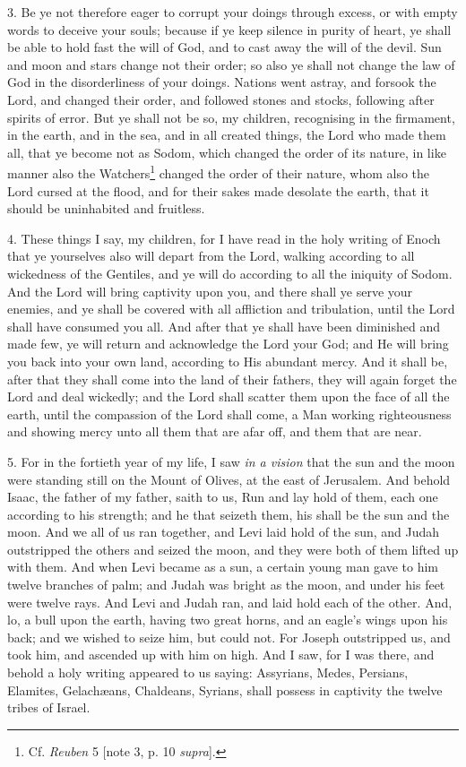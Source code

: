 3. Be ye not therefore eager to corrupt your doings through excess, or with empty words to deceive your souls; because if ye keep silence in purity of heart, ye shall be able to hold fast the will of God, and to cast away the will of the devil. Sun and moon and stars change not their order; so also ye shall not change the law of God in the disorderliness of your doings. Nations went astray, and forsook the Lord, and changed their order, and followed stones and stocks, following after spirits of error. But ye shall not be so, my children, recognising in the firmament, in the earth, and in the sea, and in all created things, the Lord who made them all, that ye become not as Sodom, which changed the order of its nature, in like manner also the Watchers\footnote{Cf. \emph{Reuben} 5 [note 3, p. 10 \emph{supra}].} changed the order of their nature, whom also the Lord cursed at the flood, and for their sakes made desolate the earth, that it should be uninhabited and fruitless.

4. These things I say, my children, for I have read in the holy writing of Enoch that ye yourselves also will depart from the Lord, walking according to all wickedness of the Gentiles, and ye will do according to all the iniquity of Sodom. And the Lord will bring captivity upon you, and there shall ye serve your enemies, and ye shall be covered with all affliction and tribulation, until the Lord shall have consumed you all. And after that ye shall have been diminished and made few, ye will return and acknowledge the Lord your God; and He will bring you back into your own land, according to His abundant mercy. And it shall be, after that they shall come into the land of their fathers, they will again forget the Lord and deal wickedly; and the Lord shall scatter them upon the face of all the earth, until the compassion of the Lord shall come, a Man working righteousness and showing mercy unto all them that are afar off, and them that are near.

5. For in the fortieth year of my life, I saw \emph{in a vision} that the sun and the moon were standing still on the Mount of Olives, at the east of Jerusalem. And behold Isaac, the father of my father, saith to us, Run and lay hold of them, each one according to his strength; and he that seizeth them, his shall be the sun and the moon. And we all of us ran together, and Levi laid hold of the sun, and Judah outstripped the others and seized the moon, and they were both of them lifted up with them. And when Levi became as a sun, a certain young man gave to him twelve branches of palm; and Judah was bright as the moon, and under his feet were twelve rays. And Levi and Judah ran, and laid hold each of the other. And, lo, a bull upon the earth, having two great horns, and an eagle’s wings upon his back; and we wished to seize him, but could not. For Joseph outstripped us, and took him, and ascended up with him on high. And I saw, for I was there, and behold a holy writing appeared to us saying: Assyrians, Medes, Persians, Elamites, Gelachæans, Chaldeans, Syrians, shall possess in captivity the twelve tribes of Israel.

